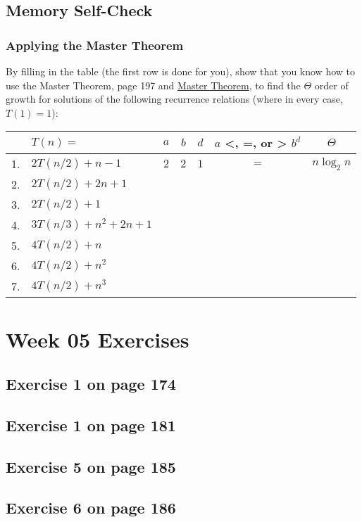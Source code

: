 \documentclass[12pt]{amsart}
\begin{document}
\subsection{Memory Self-Check}

\subsubsection{Applying the Master Theorem}


By filling in the table (the first row is done for you), show that you know
  how to use the Master Theorem, page 197 and \href{run:../support_files/master_theorem.pdf}{Master Theorem}, to find the $\Theta$ order of growth for solutions of the following recurrence relations (where in every case, $T(1) = 1$):
  \\
\begin{tabular}{|c|l|c|c|c|c|c|}
\hline
    &$T(n) =$           & $a$ & $b$ & $d$ & $a$ <, =, or > $b^d$ & $\Theta$ \\
\hline
1. & $2T(n/2)+n-1$ & $2$ & $2$ & $1$ & $=$ & $n\log_2 n$ \\
\hline
2. & $2T(n/2)+2n+1$ &  &  & & &  \\
\hline
3. & $2T(n/2)+1$ &  &  & & &  \\
\hline
4. & $3T(n/3)+n^2+2n+1$ &  &  & & &  \\
\hline
5. & $4T(n/2)+n$ &  &  & & &  \\
\hline
6. & $4T(n/2)+n^2$ &  &  & & &  \\
\hline
7. & $4T(n/2)+n^3$ &  &  & & &  \\
\hline
\end{tabular}
 \section{Week 05 Exercises}
\subsection{ Exercise 1 on page 174} 
\subsection{Exercise 1 on page 181} 
\subsection{Exercise 5 on page 185} 
\subsection{Exercise 6 on page 186} 
\end{document}
